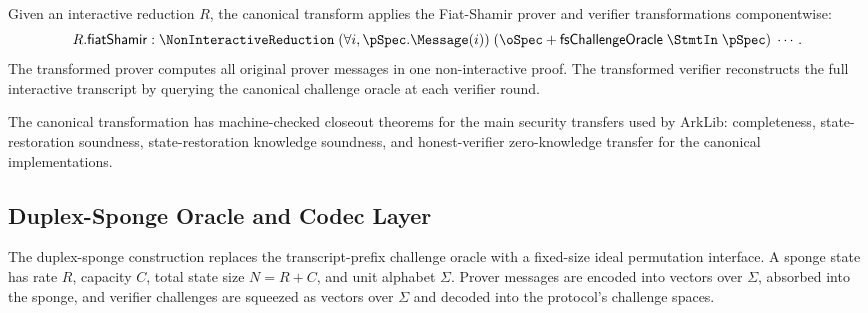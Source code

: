 \begin{definition}
    \label{def:canonical_fiat_shamir_transform}
    Given an interactive reduction $R$, the canonical transform applies the Fiat-Shamir prover
    and verifier transformations componentwise:
    \[
        R.\mathsf{fiatShamir}
        : \NonInteractiveReduction
          \;(\forall i,\pSpec.\Message(i))\;
          (\oSpec + \mathsf{fsChallengeOracle}\;\StmtIn\;\pSpec)\;\cdots .
    \]
    The transformed prover computes all original prover messages in one non-interactive proof.
    The transformed verifier reconstructs the full interactive transcript by querying the
    canonical challenge oracle at each verifier round.
\end{definition}

\begin{theorem}
    \label{thm:canonical_fiat_shamir_security}
    The canonical transformation has machine-checked closeout theorems for the main security
    transfers used by ArkLib: completeness, state-restoration soundness, state-restoration
    knowledge soundness, and honest-verifier zero-knowledge transfer for the canonical
    implementations.
\end{theorem}

\subsection{Duplex-Sponge Oracle and Codec Layer}\label{sec:fiat_shamir_duplex_oracle}

The duplex-sponge construction replaces the transcript-prefix challenge oracle with a fixed-size
ideal permutation interface. A sponge state has rate $R$, capacity $C$, total state size $N=R+C$,
and unit alphabet $\Sigma$. Prover messages are encoded into vectors over $\Sigma$, absorbed into
the sponge, and verifier challenges are squeezed as vectors over $\Sigma$ and decoded into the
protocol's challenge spaces.

